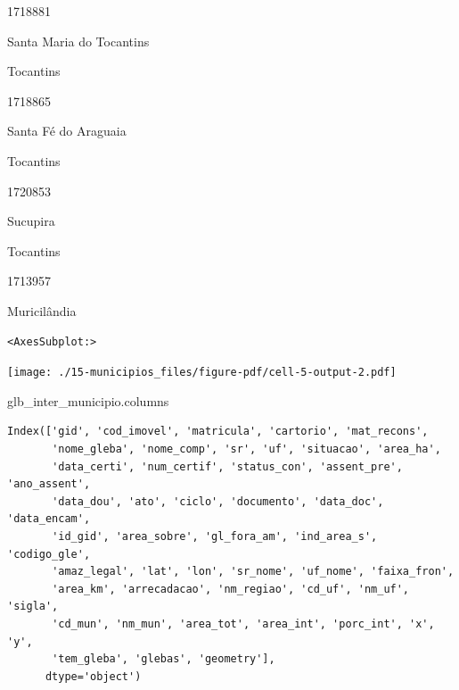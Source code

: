 \documentclass[
  letterpaper,
]{report}
\newenvironment{Shaded}{\begin{snugshade}}{\end{snugshade}}
\newcommand{\NormalTok}[1]{\textcolor[rgb]{0.00,0.23,0.31}{#1}}
\begin{document}
1718881

\n      

Santa Maria do Tocantins

\n    

\n    

\n      

Tocantins

\n      

1718865

\n      

Santa Fé do Araguaia

\n    

\n    

\n      

Tocantins

\n      

1720853

\n      

Sucupira

\n    

\n    

\n      

Tocantins

\n      

1713957

\n      

Muricilândia

\n    

\n  

\n

\begin{verbatim}
<AxesSubplot:>
\end{verbatim}

\texttt{[image: ./15-municipios\_files/figure-pdf/cell-5-output-2.pdf]}

\begin{Shaded}
\begin{Highlighting}[]
\NormalTok{glb\_inter\_municipio.columns}
\end{Highlighting}
\end{Shaded}

\begin{verbatim}
Index(['gid', 'cod_imovel', 'matricula', 'cartorio', 'mat_recons',
       'nome_gleba', 'nome_comp', 'sr', 'uf', 'situacao', 'area_ha',
       'data_certi', 'num_certif', 'status_con', 'assent_pre', 'ano_assent',
       'data_dou', 'ato', 'ciclo', 'documento', 'data_doc', 'data_encam',
       'id_gid', 'area_sobre', 'gl_fora_am', 'ind_area_s', 'codigo_gle',
       'amaz_legal', 'lat', 'lon', 'sr_nome', 'uf_nome', 'faixa_fron',
       'area_km', 'arrecadacao', 'nm_regiao', 'cd_uf', 'nm_uf', 'sigla',
       'cd_mun', 'nm_mun', 'area_tot', 'area_int', 'porc_int', 'x', 'y',
       'tem_gleba', 'glebas', 'geometry'],
      dtype='object')
\end{verbatim}
\end{document}
